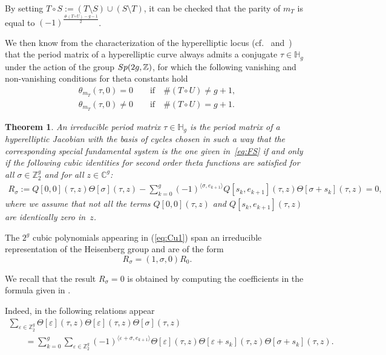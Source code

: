 \documentclass[11pt]{article}
\numberwithin{equation}{section}
\numberwithin{equation}{section}
\newtheorem{Theorem}{Theorem}[section]
\newcommand{\ep}{\varepsilon}
\newcommand{\CC}{{\mathbb{C}}}
\newcommand{\HH}{{\mathbb{H}}}
\newcommand{\ZZ}{{\mathbb{Z}}}
\def\ZZ{{\mathbb Z}}
\def\s{\sigma}
\def\T{\Theta}
\begin{document}
By setting $T\circ S:= (T\setminus S)\cup (S\setminus T)$, it can be checked that the parity of $m_T$ is equal to $(-1)^{\frac{\#(T\circ U)-g-1}{2}}$.

We then know from the characterization of the hyperelliptic locus (cf.~\cite{Th} and~\cite{mu}) that the period matrix of a hyperelliptic curve always admits a conjugate $\tau \in \HH_g$ under the action of the group ${\rm Sp}(2g, \ZZ)$, for which the following vanishing and non-vanishing conditions for theta constants hold
\begin{gather}
\theta_{m_T} (\tau,0)=0 \qquad \text{if} \quad \#(T\circ U)\neq g+1, \label{vanishing}\\
\theta_{m_T} (\tau,0) \neq 0 \qquad \text{if} \quad \#(T\circ U) = g+1. \label{nonvanishing}
\end{gather}

\setcounter{equation}{5}
\begin{Theorem}\label{th.Gr} An irreducible period matrix $\tau\in \HH_g$ is the period matrix
of a hyperelliptic Jacobian with the basis of cycles chosen in such a way that the corresponding special fundamental system is the one given in~\eqref{eq:FS} if and only if the following cubic identities for second order theta functions are satisfied for all $\s\in \ZZ_2^g$ and for all $z\in \CC^g$:
 \begin{gather}\label{eq:Cu1}
 R_{\s}:= Q[0,0](\tau, z)\T[\s](\tau,z)- \sum_{k=0}^g (-1)^{\langle \s, e_{k+1}\rangle}
Q[s_k, e_{k+1}](\tau, z)\T[\s+s_k](\tau,z)=0,
\end{gather}
where we assume that not all the terms $ Q[0,0](\tau, z)$ and $Q[s_k, e_{k+1}](\tau, z)$ are identically zero in~$z$.
\end{Theorem}
\begin{Remark} The $2^g$ cubic polynomials appearing in (\ref{eq:Cu1}) span an irreducible representation of the Heisenberg group and are of the form
\[R_{\s}=(1,\s,0)R_0.
\]
\end{Remark}

We recall that the result $R_{\s}=0$ is obtained by computing the coefficients in the
formula given in \cite{BK2}.

Indeed, in \cite{Gr} the following relations appear
\begin{gather}
 \sum_{\ep\in\ZZ_2^g} \T[\ep](\tau,z)\T[\ep](\tau,z)\T[\s](\tau,z)\nonumber\\
\qquad {}= \sum_{k=0}^g \sum_{\ep\in\ZZ_2^g} (-1)^{\langle \ep+\s, e_{k+1}\rangle}\T[\ep](\tau,z)\T[\ep+ s_k](\tau,z)\T[\s+s_k](\tau,z). \label{eq:Cu}
\end{gather}
\end{document}
